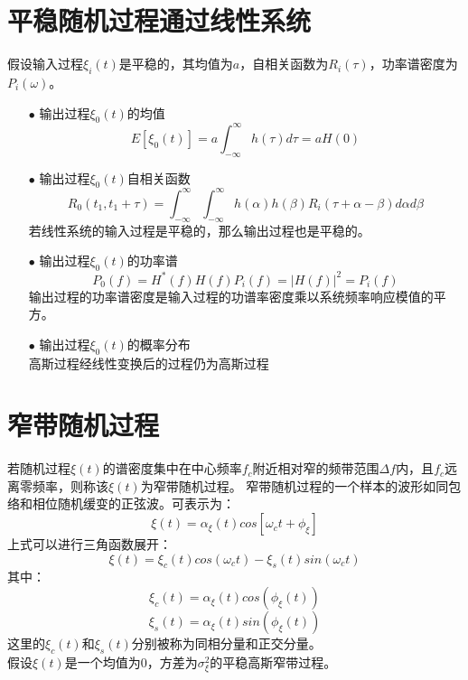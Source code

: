 \documentclass[12pt,a4paper,oneside]{ctexart}
\begin{document}
\section{平稳随机过程通过线性系统}
假设输入过程$\xi_{i}(t)$是平稳的，其均值为$a$，自相关函数为$R_{i}(\tau)$，功率谱密度为$P_{i}(\omega)$。
\begin{itemize}
    \item[$\bullet$] 输出过程$\xi_{0}(t)$的均值
    $$
        E\left[\xi_{0}(t)\right] = a\int_{-\infty}^{\infty}h(\tau)d\tau = aH(0)
    $$
    \item[$\bullet$] 输出过程$\xi_{0}(t)$自相关函数
    $$
        R_{0}(t_{1},t_{1} + \tau) = \int_{-\infty}^{\infty}\int_{-\infty}^{\infty}h(\alpha)h(\beta)R_{i}(\tau + \alpha - \beta)d\alpha d\beta
    $$ 
    若线性系统的输入过程是平稳的，那么输出过程也是平稳的。
    \item[$\bullet$] 输出过程$\xi_{0}(t)$的功率谱
    $$
        P_{0}(f) = H^{*}(f)H(f)P_{i}(f) = |H(f)|^{2} = P_{i}(f)  
    $$
    输出过程的功率谱密度是输入过程的功谱率密度乘以系统频率响应模值的平方。
    \item[$\bullet$] 输出过程$\xi_{0}(t)$的概率分布\\
    高斯过程经线性变换后的过程仍为高斯过程 
\end{itemize}
\section{窄带随机过程}
若随机过程$\xi(t)$的谱密度集中在中心频率$f_{c}$附近相对窄的频带范围$\Delta f$内，且$f_{c}$远离零频率，则称该$\xi(t)$为窄带随机过程。
窄带随机过程的一个样本的波形如同包络和相位随机缓变的正弦波。可表示为：
$$
    \xi(t) = \alpha_{\xi}(t)cos\left[\omega_{c}t + \phi_{\xi} \right]
$$
上式可以进行三角函数展开：
$$
    \xi(t) = \xi_{c}(t)cos(\omega_{c}t) - \xi_{s}(t)sin(\omega_{c}t)
$$
其中：
$$
    \xi_{c}(t) = \alpha_{\xi}(t)cos(\phi_{\xi}(t))
$$
$$
    \xi_{s}(t) = \alpha_{\xi}(t)sin(\phi_{\xi}(t))
$$
这里的$\xi_{c}(t)$和$\xi_{s}(t)$分别被称为同相分量和正交分量。\\
假设$\xi(t)$是一个均值为0，方差为$\sigma^{2}_{\xi}$的平稳高斯窄带过程。
\end{document}
